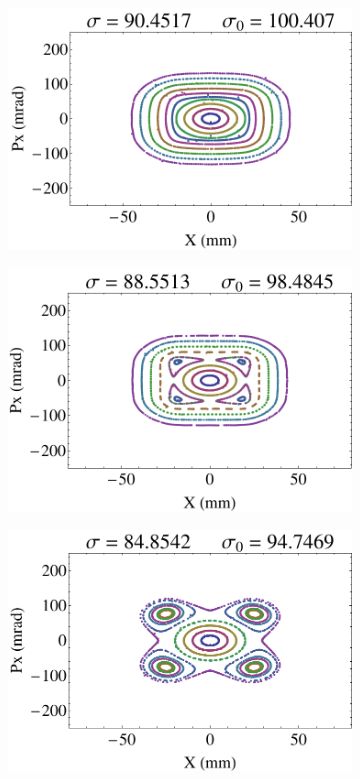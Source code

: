 \begin{figure}
    \centering
    \begin{subfigure}[b]{0.24\textwidth}
        \includegraphics[width=\textwidth]{Img/TestParticle1.pdf}
        \caption{}\label{sfig:TestPtc1}
    \end{subfigure}
    \begin{subfigure}[b]{0.24\textwidth}
        \includegraphics[width=\textwidth]{Img/TestParticle2.pdf}
        \caption{}\label{sfig:TestPtc2}
    \end{subfigure}
    \begin{subfigure}[b]{0.24\textwidth}
        \includegraphics[width=\textwidth]{Img/TestParticle3.pdf}

\end{subfigure}
\end{figure}
